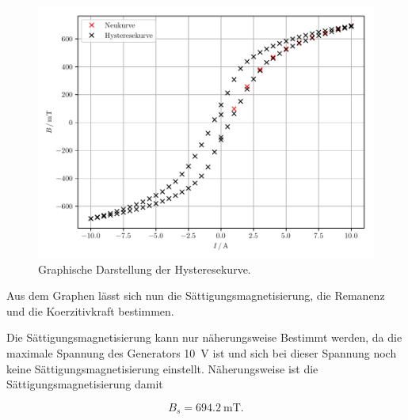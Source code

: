 \begin{figure}[H]
  \centering
  \includegraphics{plot6.pdf}
  \caption{Graphische Darstellung der Hysteresekurve.}
  \label{abb:12}
\end{figure}

Aus dem Graphen lässt sich nun die Sättigungsmagnetisierung, die Remanenz und die
Koerzitivkraft bestimmen.

Die Sättigungsmagnetisierung kann nur näherungsweise Bestimmt werden, da die
maximale Spannung des Generators \SI{10}{\volt} ist und sich bei dieser Spannung noch
keine Sättigungsmagnetisierung einstellt. Näherungsweise ist die Sättigungsmagnetisierung
damit

\begin{equation*}
  B_s = \SI{694.2}{\milli\tesla}.
\end{equation*}
